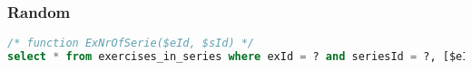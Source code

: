 \subsubsection{Random}
\begin{lstlisting}[language=sql]
/* function ExNrOfSerie($eId, $sId) */
select * from exercises_in_series where exId = ? and seriesId = ?, [$eId, $sId];
\end{lstlisting}

